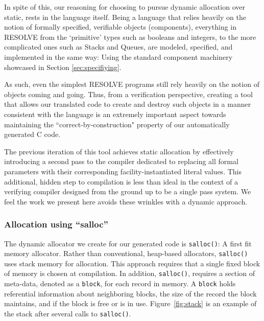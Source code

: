 
In spite of this, our reasoning for choosing to pursue dynamic allocation over static, rests in the language itself. Being a language that relies heavily on the notion of formally specified, verifiable objects (components), everything in RESOLVE from the `primitive' types such as booleans and integers, to the more complicated ones such as Stacks and Queues, are modeled, specified, and implemented in the same way: Using the standard component machinery showcased in Section \ref{sec:specifiying}. 

As such, even the simplest RESOLVE programs still rely heavily on the notion of objects coming and going. Thus, from a verification perspective, creating a tool that allows our translated code to create and destroy such objects in a manner consistent with the language is an extremely important aspect towards maintaining the ``correct-by-construction" property of our automatically generated C code.

The previous iteration of this tool \cite{regula:2010} achieves static allocation by effectively introducing a second pass to the compiler dedicated to replacing all formal parameters with their corresponding facility-instantiated literal values. This additional, hidden step to compilation is less than ideal in the context of a verifying compiler designed from the ground up to be a single pass system. We feel the work we present here avoids these wrinkles with a dynamic approach.

\subsubsection{Allocation using ``salloc''}

The dynamic allocator we create for our generated code is \texttt{salloc()}: A first fit memory allocator. Rather than conventional, heap-based allocators, \texttt{salloc()} uses stack memory for allocation. This approach requires that a single fixed block of memory is chosen at compilation. In addition, \texttt{salloc()}, requires a section of meta-data, denoted as a \texttt{block}, for each record in memory. A \texttt{block} holds referential information about neighboring blocks, the size of the record the block maintains, and if the block is free or is in use. Figure~\ref{fig:stack} is an example of the stack after several calls to \texttt{salloc()}.

